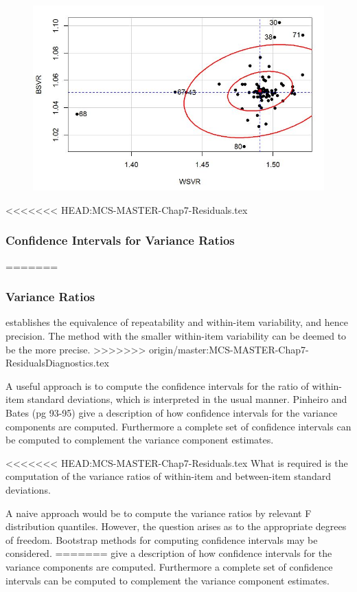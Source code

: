 \documentclass[12pt, a4paper]{report}
\theoremstyle{plain}
\theoremstyle{definition}
\theoremstyle{remark}
\begin{document}
	\begin{figure}[h!]
		\centering
		\includegraphics[width=0.9\linewidth]{images/08-plot1}
		\caption{}
		\label{fig:08-plot1}
	\end{figure}
	


<<<<<<< HEAD:MCS-MASTER-Chap7-Residuals.tex
\subsubsection{Confidence Intervals for Variance Ratios}
=======
\subsubsection{Variance Ratios}
\citet{ARoy2009} establishes the equivalence of repeatability and within-item variability, and hence precision.  The method with the smaller within-item variability can be deemed to be the more precise.
>>>>>>> origin/master:MCS-MASTER-Chap7-ResidualsDiagnostics.tex
	
A useful approach is to compute the confidence intervals for the ratio of within-item standard deviations, which is interpreted in the usual manner.
Pinheiro and Bates (pg 93-95) give a description of how confidence intervals for the variance components are computed. Furthermore a complete set of confidence intervals can be computed to complement the variance component estimates.
	
<<<<<<< HEAD:MCS-MASTER-Chap7-Residuals.tex
What is required is the computation of the variance ratios of within-item and between-item standard deviations.
	
A naive approach would be to compute the variance ratios by relevant F distribution quantiles. However, the question arises as to the appropriate degrees of freedom. Bootstrap methods for computing confidence intervals may be considered.
=======
\citet[pg 93-95]{PB} give a description of how confidence intervals for the variance components are computed. Furthermore a complete set of confidence intervals can be computed to complement the variance component estimates.
	
\end{document}
